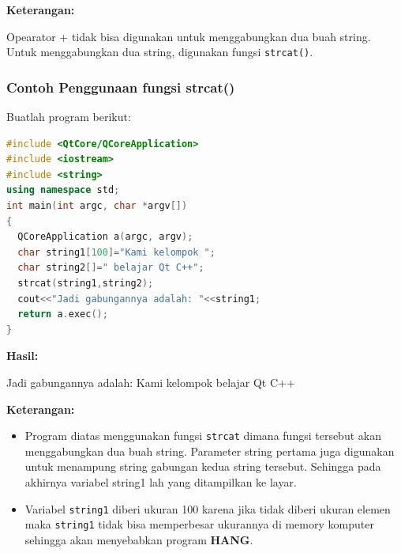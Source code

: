 \textbf{Keterangan:}

Opearator + tidak bisa digunakan untuk menggabungkan dua buah string.
Untuk menggabungkan dua string, digunakan fungsi \texttt{strcat()}.

\subsubsection*{Contoh  Penggunaan fungsi strcat()}

Buatlah program berikut:

\begin{lstlisting}[language=c++, caption=Penggunaan fungsi strcat(), label=contoh3-23]
#include <QtCore/QCoreApplication>
#include <iostream>
#include <string>
using namespace std;
int main(int argc, char *argv[])
{
  QCoreApplication a(argc, argv);
  char string1[100]="Kami kelompok ";
  char string2[]=" belajar Qt C++";
  strcat(string1,string2);
  cout<<"Jadi gabungannya adalah: "<<string1;
  return a.exec();
}
\end{lstlisting}

\textbf{Hasil:}

\begin{lcverbatim}
Jadi gabungannya adalah:
Kami kelompok belajar Qt C++
\end{lcverbatim}


\textbf{Keterangan:}

\begin{itemize}

\item
  Program diatas menggunakan fungsi \texttt{strcat} dimana fungsi
  tersebut akan menggabungkan dua buah string. Parameter string pertama
  juga digunakan untuk menampung string gabungan kedua string tersebut.
  Sehingga pada akhirnya variabel string1 lah yang ditampilkan ke layar.
\item
  Variabel \texttt{string1} diberi ukuran 100 karena jika tidak diberi
  ukuran elemen maka \texttt{string1} tidak bisa memperbesar ukurannya
  di memory komputer sehingga akan menyebabkan program \textbf{HANG}.
\end{itemize}

